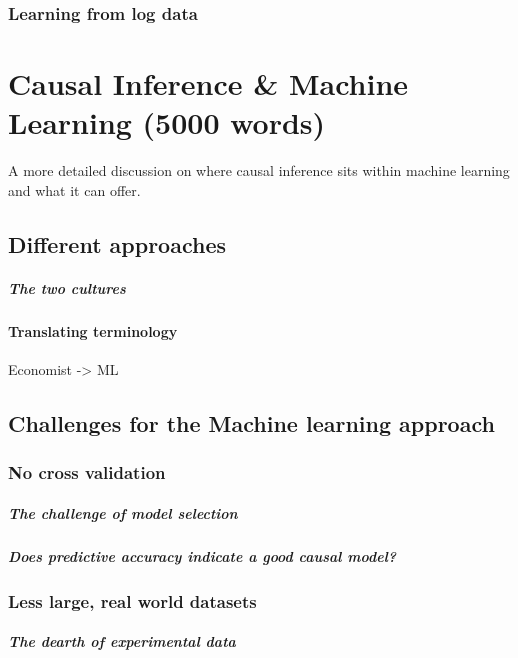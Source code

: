 \documentclass[11pt,a4paper,oneside]{book}
\begin{document}
\subsection*{Learning from log data}



\chapter*{Causal Inference \& Machine Learning (5000 words)}
A more detailed discussion on where causal inference sits within machine learning and what it can offer.



\section*{Different approaches}
\paragraph{The two cultures}


\subsubsection*{Translating terminology}
Economist -> ML

\section*{Challenges for the Machine learning approach}
\subsection*{No cross validation}
\paragraph*{The challenge of model selection}
\paragraph*{Does predictive accuracy indicate a good causal model?}
\subsection*{Less large, real world datasets}
\paragraph*{The dearth of experimental data}
\end{document}
